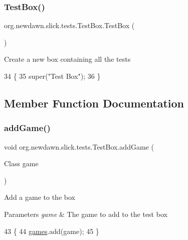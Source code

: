 \subsubsection{\texorpdfstring{Test\+Box()}{TestBox()}}
{\footnotesize\ttfamily org.\+newdawn.\+slick.\+tests.\+Test\+Box.\+Test\+Box (\begin{DoxyParamCaption}{ }\end{DoxyParamCaption})\hspace{0.3cm}{\ttfamily [inline]}}

Create a new box containing all the tests 
\begin{DoxyCode}
34                      \{
35         super(\textcolor{stringliteral}{"Test Box"});
36     \}
\end{DoxyCode}


\subsection{Member Function Documentation}
\mbox{\label{classorg_1_1newdawn_1_1slick_1_1tests_1_1_test_box_a435f291b54dc02ebc668f95f3cfb6b48}} 
\subsubsection{\texorpdfstring{add\+Game()}{addGame()}}
{\footnotesize\ttfamily void org.\+newdawn.\+slick.\+tests.\+Test\+Box.\+add\+Game (\begin{DoxyParamCaption}\item[{Class}]{game }\end{DoxyParamCaption})\hspace{0.3cm}{\ttfamily [inline]}}

Add a game to the box


\begin{DoxyParams}{Parameters}
{\em game} & The game to add to the test box \\
\hline
\end{DoxyParams}

\begin{DoxyCode}
43                                     \{
44         \mbox{\hyperlink{classorg_1_1newdawn_1_1slick_1_1tests_1_1_test_box_abd3484ab8c25058d32bff289a1b032e6}{games}}.add(game);
45     \}
\end{DoxyCode}
\mbox{\label{classorg_1_1newdawn_1_1slick_1_1tests_1_1_test_box_a26fb5a8be9ff46cb1a0d0e4bd0cff1f0}} 
